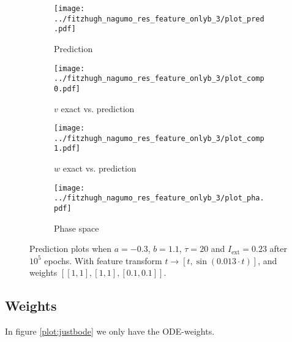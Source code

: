 \documentclass[a4paper]{article}
\begin{document}
\begin{figure}[H]
	\centering 
	\begin{subfigure}[b]{0.47\textwidth}
		\centering
		\texttt{[image: ../fitzhugh\_nagumo\_res\_feature\_onlyb\_3/plot\_pred.pdf]}
		\caption{Prediction}
		\label{fig:justb04a}
	\end{subfigure}
	\begin{subfigure}[b]{0.47\textwidth}
		\centering
		\texttt{[image: ../fitzhugh\_nagumo\_res\_feature\_onlyb\_3/plot\_comp0.pdf]}
		\caption{$v$ exact vs. prediction}
		\label{fig:justb04b}
	\end{subfigure}
	\begin{subfigure}[b]{0.47\textwidth}
		\centering
		\texttt{[image: ../fitzhugh\_nagumo\_res\_feature\_onlyb\_3/plot\_comp1.pdf]}
		\caption{$w$ exact vs. prediction}
		\label{fig:justb04c}
	\end{subfigure}
	\begin{subfigure}[b]{0.47\textwidth}
		\centering
		\texttt{[image: ../fitzhugh\_nagumo\_res\_feature\_onlyb\_3/plot\_pha.pdf]}
		\caption{Phase space}
		\label{fig:justb04d}
	\end{subfigure}
	\caption{Prediction plots when $a=-0.3$, $b=1.1$, $\tau=20$ and $ I_{\text{ext}}=0.23$ after $10^5$ epochs. With feature transform $t \rightarrow \left[ t, \sin(0.013\cdot t) \right] $, and weights $\left[ \left[ 1, 1\right], \left[ 1, 1\right], \left[ 0.1, 0.1 \right]\right]$.}
	\label{plot:justb04}
\end{figure} 	



\subsection{Weights}

In figure \ref{plot:justbode} we only have the ODE-weights. 
\end{document}
